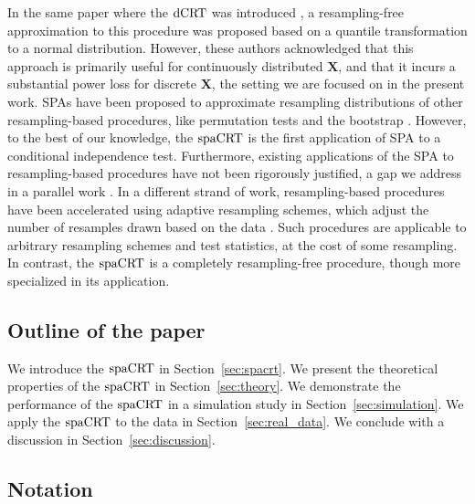\documentclass[12pt]{article}
\theoremstyle{definition}
\newcommand{\prx}{\bm X}								%
\newcommand{\dCRT}{\textnormal{dCRT}} 					%
\newcommand{\spacrt}{\textnormal{spaCRT}}               %
\begin{document}
In the same paper where the $\dCRT$ was introduced \citep{Liu2022a}, a resampling-free approximation to this procedure was proposed based on a quantile transformation to a normal distribution. However, these authors acknowledged that this approach is primarily useful for continuously distributed $\prx$, and that it incurs a substantial power loss for discrete $\prx$, the setting we are focused on in the present work. SPAs have been proposed to approximate resampling distributions of other resampling-based procedures, like permutation tests \citep{Robinson1982} and the bootstrap \citep{Hinkley1988}. However, to the best of our knowledge, the $\spacrt$ is the first application of SPA to a conditional independence test. Furthermore, existing applications of the SPA to resampling-based procedures have not been rigorously justified, a gap we address in a parallel work \citep{Niu2024}. In a different strand of work, resampling-based procedures have been accelerated using adaptive resampling schemes, which adjust the number of resamples drawn based on the data \citep{Besag1991,Gandy2009,Gandy2014,Gandy2016,Gandy2017a,Fischer2024a,Fischer2024}. Such procedures are applicable to arbitrary resampling schemes and test statistics, at the cost of some resampling. In contrast, the $\spacrt$ is a completely resampling-free procedure, though more specialized in its application.

\subsection{Outline of the paper}

We introduce the $\spacrt$ in Section~\ref{sec:spacrt}. We present the theoretical properties of the $\spacrt$ in Section~\ref{sec:theory}. We demonstrate the performance of the $\spacrt$ in a simulation study in Section~\ref{sec:simulation}. We apply the $\spacrt$ to the \citet{Gasperini2019a} data in Section~\ref{sec:real_data}. We conclude with a discussion in Section~\ref{sec:discussion}.

\subsection{Notation}
\end{document}
